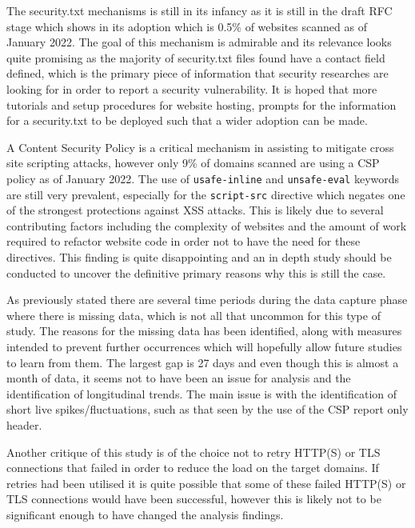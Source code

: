 \documentclass{mscreport}
\begin{document}
\vspace{0.3cm} \noindent
The security.txt mechanisms is still in its infancy as it is still in the draft RFC stage which shows in its adoption which is 0.5\% of websites scanned as of January 2022. The goal of this mechanism is admirable and its relevance looks quite promising as the majority of security.txt files found have a contact field defined, which is the primary piece of information that security researches are looking for in order to report a security vulnerability. It is hoped that more tutorials and setup procedures for website hosting, prompts for the information for a security.txt to be deployed such that a wider adoption can be made.

\vspace{0.3cm} \noindent
A Content Security Policy is a critical mechanism in assisting to mitigate cross site scripting attacks, however only 9\% of domains scanned are using a CSP policy as of January 2022. The use of \texttt{usafe-inline} and \texttt{unsafe-eval} keywords are still very prevalent, especially for the \texttt{script-src} directive which negates one of the strongest protections against XSS attacks. This is likely due to several contributing factors including the complexity of websites and the amount of work required to refactor website code in order not to have the need for these directives. This finding is quite disappointing and an in depth study should be conducted to uncover the definitive primary reasons why this is still the case. 

\vspace{0.3cm} \noindent
As previously stated there are several time periods during the data capture phase where there is missing data, which is not all that uncommon for this type of study. The reasons for the missing data has been identified, along with measures intended to prevent further occurrences which will hopefully allow future studies to learn from them. The largest gap is 27 days and even though this is almost a month of data, it seems not to have been an issue for analysis and the identification of longitudinal trends. The main issue is with the identification of short live spikes/fluctuations, such as that seen by the use of the CSP report only header.

\vspace{0.3cm} \noindent
Another critique of this study is of the choice not to retry HTTP(S) or TLS connections that failed in order to reduce the load on the target domains. If retries had been utilised it is quite possible that some of these failed HTTP(S) or TLS connections would have been successful, however this is likely not to be significant enough to have changed the analysis findings.
\end{document}
